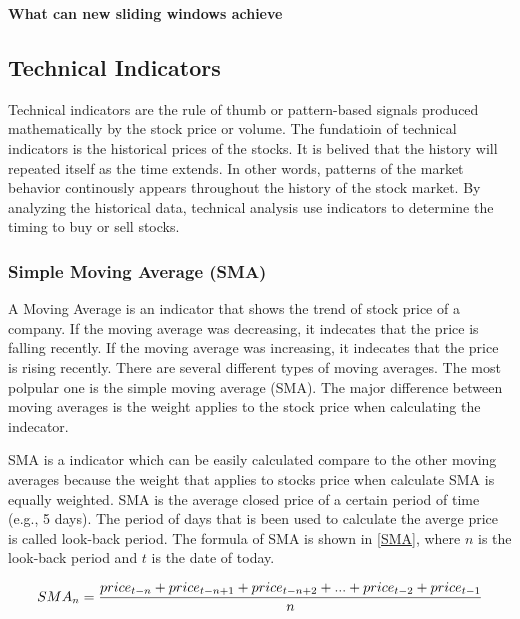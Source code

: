\documentclass[../main.tex]{subfiles}
\begin{document}
\textbf{What can new sliding windows achieve}

\subsection{Technical Indicators}

Technical indicators are the rule of thumb or pattern-based signals produced mathematically by the stock price or volume. The fundatioin of technical indicators is the historical prices of the stocks. It is belived that the history will repeated itself as the time extends. In other words, patterns of the market behavior continously appears throughout the history of the stock market. By analyzing the historical data, technical analysis use indicators to determine the timing to buy or sell stocks.

\subsubsection{Simple Moving Average (SMA)}

A Moving Average is an indicator that shows the trend of stock price of a company. If the moving average was decreasing, it indecates that the price is falling recently. If the moving average was increasing, it indecates that the price is rising recently. There are several different types of moving averages. The most polpular one is the simple moving average (SMA). The major difference between moving averages is the weight applies to the stock price when calculating the indecator.
\bigbreak

SMA is a indicator which can be easily calculated compare to the other moving averages because the weight that applies to stocks price when calculate SMA is equally weighted. SMA is the average closed price of a certain period of time (e.g., 5 days). The period of days that is been used to calculate the averge price is called look-back period. The formula of SMA is shown in \ref{SMA}, where $n$ is the look-back period and $t$ is the date of today.

\begin{equation}\label{SMA}\scalebox{1}
    {$SMA_{n} = \dfrac{price_{t-n}+price_{t-n+1}+price_{t-n+2}+...+price_{t-2}+price_{t-1}}{n}$}
\end{equation}
\bigbreak
\end{document}
